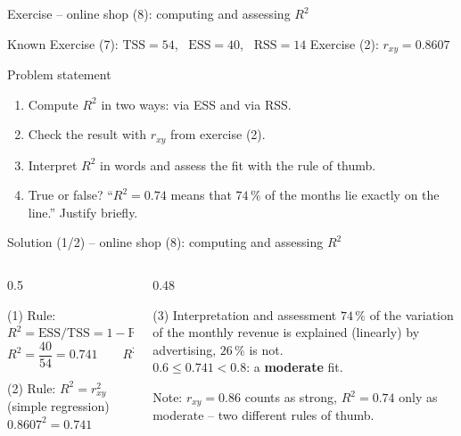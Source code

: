 \documentclass[aspectratio=169,11pt]{beamer}
\begin{document}
\begin{frame}{Exercise -- online shop (8): computing and assessing $R^2$}
  \begin{block}{Known}
    Exercise (7): $\text{TSS} = 54$, \ $\text{ESS} = 40$, \ $\text{RSS} = 14$
    \qquad Exercise (2): $r_{xy} = 0.8607$
  \end{block}

  \medskip

  \begin{block}{Problem statement}
    \begin{enumerate}
      \setlength{\itemsep}{3pt}
      \item Compute $R^{2}$ in two ways: via ESS and via RSS.
      \item Check the result with $r_{xy}$ from exercise (2).
      \item Interpret $R^{2}$ in words and assess the fit with the rule of
            thumb.
      \item True or false? ``$R^2 = 0.74$ means that $74\,\%$ of the months
            lie exactly on the line.'' Justify briefly.
    \end{enumerate}
  \end{block}
\end{frame}

\begin{frame}{Solution (1/2) -- online shop (8): computing and assessing $R^2$}
  \begin{columns}[T]
    \begin{column}{0.5\textwidth}
      \begin{block}{(1) Rule: $R^{2} = \text{ESS}/\text{TSS} = 1 - \text{RSS}/\text{TSS}$}
        \[
          R^{2} = \frac{40}{54} = \mathbf{0.741}
          \qquad
          R^{2} = 1 - \frac{14}{54} = 0.741
        \]
        \vspace{-10pt}
      \end{block}
      \begin{block}{(2) Rule: $R^{2} = r_{xy}^{2}$ (simple regression)}
        $0.8607^{2} = 0.741$ \checkmark
      \end{block}
    \end{column}
    \begin{column}{0.48\textwidth}
      \begin{exampleblock}{(3) Interpretation and assessment}
        $74\,\%$ of the variation of the monthly revenue is explained
        (linearly) by advertising, $26\,\%$ is not.\\[3pt]
        $0.6 \le 0.741 < 0.8$: a \textbf{moderate} fit.
      \end{exampleblock}
      \footnotesize Note: $r_{xy} = 0.86$ counts as strong, $R^{2} = 0.74$ only
      as moderate -- two different rules of thumb.
    \end{column}
  \end{columns}
\end{frame}
\end{document}
